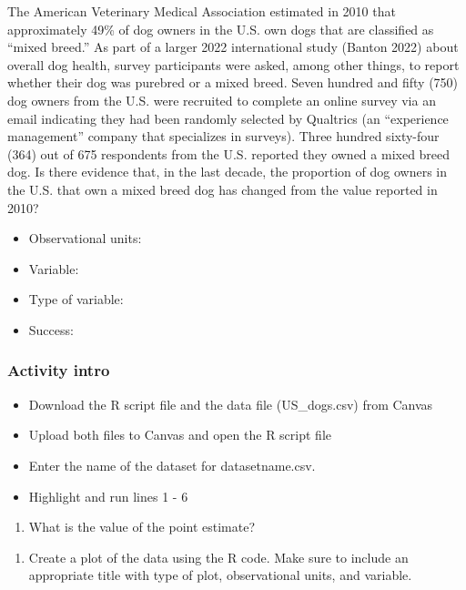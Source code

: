\documentclass[
]{report}
\providecommand{\tightlist}{%
  \setlength{\itemsep}{0pt}\setlength{\parskip}{0pt}}
\begin{document}
The American Veterinary Medical Association estimated in 2010 that approximately 49\% of dog owners in the U.S. own dogs that are classified as ``mixed breed.'' As part of a larger 2022 international study (Banton 2022) about overall dog health, survey participants were asked, among other things, to report whether their dog was purebred or a mixed breed. Seven hundred and fifty (750) dog owners from the U.S. were recruited to complete an online survey via an email indicating they had been randomly selected by Qualtrics (an ``experience management'' company that specializes in surveys). Three hundred sixty-four (364) out of 675 respondents from the U.S. reported they owned a mixed breed dog. Is there evidence that, in the last decade, the proportion of dog owners in the U.S. that own a mixed breed dog has changed from the value reported in 2010?

\begin{itemize}
\item
  Observational units:
\item
  Variable:
\item
  Type of variable:
\item
  Success:
\end{itemize}

\subsubsection*{Activity intro}\label{activity-intro-1}

\begin{itemize}
\item
  Download the R script file and the data file (US\_dogs.csv) from Canvas
\item
  Upload both files to Canvas and open the R script file
\item
  Enter the name of the dataset for datasetname.csv.
\item
  Highlight and run lines 1 - 6
\end{itemize}

\begin{enumerate}
\def\labelenumi{\arabic{enumi}.}
\tightlist
\item
  What is the value of the point estimate?
\end{enumerate}

\vspace{0.3in}

\begin{enumerate}
\def\labelenumi{\arabic{enumi}.}
\setcounter{enumi}{1}
\tightlist
\item
  Create a plot of the data using the R code. Make sure to include an appropriate title with type of plot, observational units, and variable.
\end{enumerate}
\end{document}
